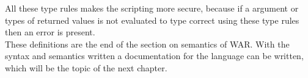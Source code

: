 	All these type rules makes the scripting more secure, because if a argument or types of returned values is not evaluated to type correct 
	using these type rules then an error is present. \\
	
	These definitions are the end of the section on semantics of WAR. 
	With the syntax and semantics written a documentation for the language can be written, which will be the topic of the next chapter.